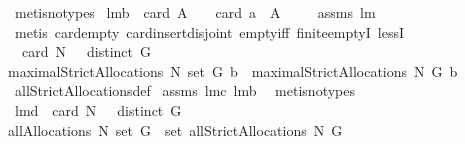 \begin{isabellebody}
\ {\isacharparenleft}metis{\isacharparenleft}no{\isacharunderscore}types{\isacharparenright}{\isacharparenright}%
\endisatagproof
{\isafoldproof}%
%
\isadelimproof
\isanewline
%
\endisadelimproof
{}\isamarkupfalse%
\ lm{}{}b{\isacharcolon}\ \ {\isachardoublequoteopen}card\ A\ {\isachargreater}\ {}{\isachardoublequoteclose}\ \ {\isachardoublequoteopen}card\ {\isacharparenleft}{\isacharbraceleft}a{\isacharbraceright}\ {\isasymunion}\ A{\isacharparenright}\ {\isachargreater}\ {}{\isachardoublequoteclose}%
\isadelimproof
\ %
\endisadelimproof
%
\isatagproof
{}\isamarkupfalse%
\ assms\ lm{}{}\ \isanewline
{}\isamarkupfalse%
\ {\isacharparenleft}metis\ card{\isacharunderscore}empty\ card{\isacharunderscore}insert{\isacharunderscore}disjoint\ empty{\isacharunderscore}iff\ finite{\isachardot}emptyI\ lessI{\isacharparenright}%
\endisatagproof
{\isafoldproof}%
%
\isadelimproof
%
\endisadelimproof
\isanewline
\isanewline
{}\isamarkupfalse%
\ \ {\isachardoublequoteopen}card\ N\ {\isachargreater}\ {}{\isachardoublequoteclose}\ {\isachardoublequoteopen}distinct\ G{\isachardoublequoteclose}\ \isanewline
{\isachardoublequoteopen}maximalStrictAllocations{\isacharprime}\ N\ {\isacharparenleft}set\ G{\isacharparenright}\ b\ {\isacharequal}\ maximalStrictAllocations\ N\ G\ b{\isachardoublequoteclose}\isanewline
%
\isadelimproof
%
\endisadelimproof
%
\isatagproof
{}\isamarkupfalse%
\ allStrictAllocations{\isacharunderscore}def\isanewline
{}\isamarkupfalse%
\ assms\ lm{}{}c\ lm{}{}b\ \isamarkupfalse%
\ {\isacharparenleft}metis{\isacharparenleft}no{\isacharunderscore}types{\isacharparenright}{\isacharparenright}%
\endisatagproof
{\isafoldproof}%
%
\isadelimproof
\isanewline
%
\endisadelimproof
\isanewline
\isanewline
\isanewline
{}\isamarkupfalse%
\ lm{}{}d{\isacharcolon}\ \ {\isachardoublequoteopen}card\ N\ {\isachargreater}\ {}{\isachardoublequoteclose}\ {\isachardoublequoteopen}distinct\ G{\isachardoublequoteclose}\ \ \isanewline
{\isachardoublequoteopen}allAllocations\ N\ {\isacharparenleft}set\ G{\isacharparenright}\ {\isacharequal}\ set\ {\isacharparenleft}allStrictAllocations\ N\ G{\isacharparenright}{\isachardoublequoteclose}\ \isanewline
%
\isadelimproof

\end{isabellebody}
